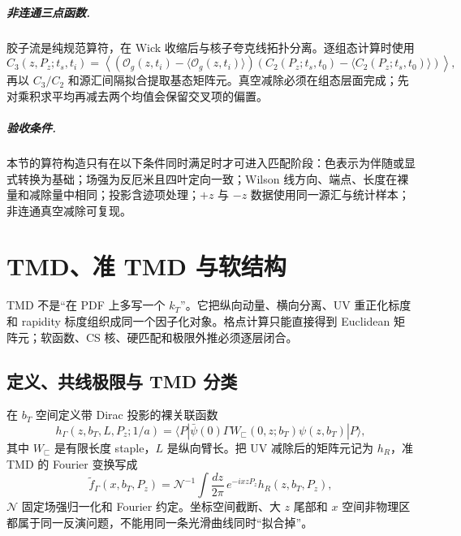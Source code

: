 \paragraph{非连通三点函数.}
胶子流是纯规范算符，在 Wick 收缩后与核子夸克线拓扑分离。逐组态计算时使用
\begin{equation}
  C_{3}(z,P_z;t_s,t_i)
  =\left\langle
    \left(\mathcal O_g(z,t_i)-\langle\mathcal O_g(z,t_i)\rangle\right)
    \left(C_2(P_z;t_s,t_0)-\langle C_2(P_z;t_s,t_0)\rangle\right)
  \right\rangle ,
  \label{eq:b05-disconnected}
\end{equation}
再以 \(C_3/C_2\) 和源汇间隔拟合提取基态矩阵元。真空减除必须在组态层面完成；先对乘积求平均再减去两个均值会保留交叉项的偏置。

\paragraph{验收条件.}
本节的算符构造只有在以下条件同时满足时才可进入匹配阶段：色表示为伴随或显式转换为基础；场强为反厄米且四叶定向一致；Wilson 线方向、端点、长度在裸量和减除量中相同；投影含迹项处理；\(+z\) 与 \(-z\) 数据使用同一源汇与统计样本；非连通真空减除可复现。

\chapter{TMD、准 TMD 与软结构}
\label{sec:b05-tmd}

TMD 不是“在 PDF 上多写一个 \(k_T\)”。它把纵向动量、横向分离、UV 重正化标度和 rapidity 标度组织成同一个因子化对象。格点计算只能直接得到 Euclidean 矩阵元；软函数、CS 核、硬匹配和极限外推必须逐层闭合。

\section{定义、共线极限与 TMD 分类}

在 \(b_T\) 空间定义带 Dirac 投影的裸关联函数
\begin{equation}
  h_{\Gamma}(z,b_T,L,P_z;1/a)
  =\langle P|\bar\psi(0)\Gamma
    W_{\sqsubset}(0,z;b_T)\psi(z,b_T)|P\rangle ,
  \label{eq:b05-bare-tmd}
\end{equation}
其中 \(W_{\sqsubset}\) 是有限长度 staple，\(L\) 是纵向臂长。把 UV 减除后的矩阵元记为 \(h_R\)，准 TMD 的 Fourier 变换写成
\begin{equation}
  \widetilde f_{\Gamma}(x,b_T,P_z)
  =\mathcal N^{-1}\int\frac{dz}{2\pi}\,
    e^{-ixzP_z}h_R(z,b_T,P_z),
  \label{eq:b05-quasi-tmd-fourier}
\end{equation}
\(\mathcal N\) 固定场强归一化和 Fourier 约定。坐标空间截断、大 \(z\) 尾部和 \(x\) 空间非物理区都属于同一反演问题，不能用同一条光滑曲线同时“拟合掉”。

